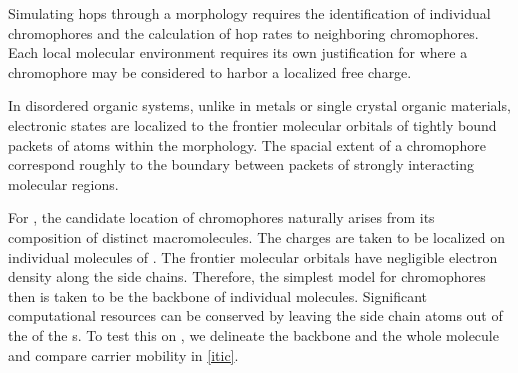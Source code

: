 Simulating hops through a morphology requires the identification of
individual chromophores and the calculation of hop rates to neighboring
chromophores. 
Each local molecular environment requires its own justification for where a chromophore 
may be considered to harbor a localized free charge.

In disordered organic systems, unlike in metals or single crystal organic materials, 
electronic states are localized to the frontier molecular orbitals of tightly
bound packets of atoms within the morphology. 
The spacial extent of a chromophore
correspond roughly to the boundary between packets of strongly interacting molecular regions.

For , the candidate location of chromophores naturally arises from its composition of distinct
macromolecules.
The charges are taken to be localized on individual molecules of . The frontier molecular orbitals have 
negligible electron density along the side chains. Therefore, the simplest model for chromophores then is
taken to be the backbone of individual molecules. Significant computational resources 
can be conserved by leaving the side chain atoms out of the of the s. 
To test this on , we delineate the backbone and the whole molecule and compare carrier mobility in \autoref{itic}.
 
